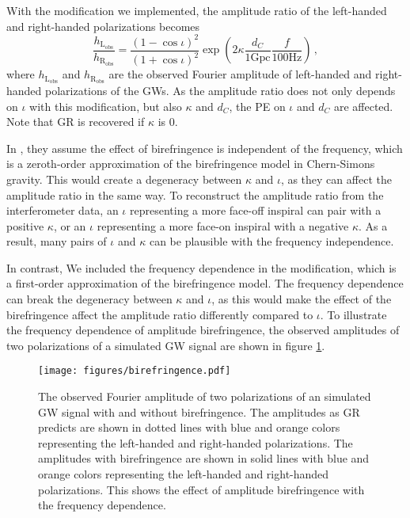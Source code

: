 \documentclass[aps,prd,twocolumn,superscriptaddress,preprintnumbers,floatfix,nofootinbib]{revtex4-2}
\begin{document}
With the modification we implemented, the amplitude ratio of the left-handed and right-handed polarizations becomes 
\begin{equation}
    \frac{h_\mathrm{L_{obs}}}{h_\mathrm{R_{obs}}}=\frac{\left(1-\cos\iota\right)^2}{\left(1+\cos\iota\right)^2}\exp\left({2\kappa\frac{d_C}{1\mathrm{Gpc}}\frac{f}{100\mathrm{Hz}}}\right)\,,
\end{equation}
where $h_\mathrm{L_{obs}}$ and $h_\mathrm{R_{obs}}$ are the observed Fourier amplitude of left-handed and right-handed polarizations of the GWs.
As the amplitude ratio does not only depends on $\iota$ with this modification, but also $\kappa$ and $d_C$, the PE on $\iota$ and $d_C$ are affected. Note that GR is recovered if $\kappa$ is $0$.

In \citet{Okounkova_2022}, they assume the effect of birefringence is independent of the frequency, which is a zeroth-order approximation of the birefringence model in Chern-Simons gravity.
This would create a degeneracy between $\kappa$ and $\iota$, as they can affect the amplitude ratio in the same way.
To reconstruct the amplitude ratio from the interferometer data, an $\iota$ representing a more face-off inspiral can pair with a positive $\kappa$, or an $\iota$ representing a more face-on inspiral with a negative $\kappa$.
As a result, many pairs of $\iota$ and $\kappa$ can be plausible with the frequency independence.

In contrast, We included the frequency dependence in the modification, which is a first-order approximation of the birefringence model.
The frequency dependence can break the degeneracy between $\kappa$ and $\iota$, as this would make the effect of the birefringence affect the amplitude ratio differently compared to $\iota$.
To illustrate the frequency dependence of amplitude birefringence, the observed amplitudes of two polarizations of a simulated GW signal are shown in figure \ref{fig:birefringence}.

\begin{figure}[h]
    \texttt{[image: figures/birefringence.pdf]}
    \caption{
        The observed Fourier amplitude of two polarizations of an simulated GW signal with and without birefringence.
        The amplitudes as GR predicts are shown in dotted lines with blue and orange colors representing the left-handed and right-handed polarizations.
        The amplitudes with birefringence are shown in solid lines with blue and orange colors representing the left-handed and right-handed polarizations.
        This shows the effect of amplitude birefringence with the frequency dependence.
    }
    \label{fig:birefringence}
\end{figure}
\end{document}
